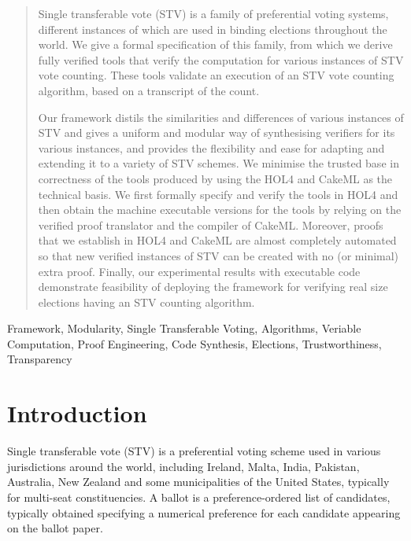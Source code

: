 \documentclass[10pt,conference]{IEEEtran}
\begin{document}
\maketitle
\begin{abstract}
Single transferable vote (STV) is a family of preferential voting systems, different instances of which are used in binding elections throughout the world. We give a formal specification of this family, from which we derive fully verified tools that verify the computation for various instances of STV vote counting. These tools validate 
 an execution of an STV vote counting algorithm, based on a transcript of the count.

Our framework distils the similarities and differences of various instances of STV and gives a uniform and modular way of synthesising verifiers for its various instances, and provides the flexibility and ease for adapting and extending it to a variety of STV schemes. We minimise the trusted base in correctness of the tools produced by using the HOL4 and CakeML as the technical basis. We first formally specify and verify the tools in HOL4 and then obtain the machine executable versions for the tools by relying on the verified proof translator and the compiler of CakeML. Moreover, proofs that we establish in HOL4 and CakeML are almost completely automated so that new verified instances of STV can be created with no (or minimal) extra proof. Finally, our experimental results with executable code demonstrate feasibility of deploying the framework for verifying real size elections having an STV counting algorithm.
\end{abstract}

\begin{IEEEkeywords}
Framework, Modularity, Single Transferable Voting, Algorithms, Veriable Computation, Proof Engineering, Code Synthesis, Elections, Trustworthiness, Transparency 
\end{IEEEkeywords}
\section{Introduction}\label{sec:intro}
Single transferable vote (STV)\cite{DFar} is a preferential voting scheme used in various jurisdictions around the world, including Ireland, Malta, India, Pakistan, Australia, New Zealand and some municipalities of the United States, typically for multi-seat constituencies.  A ballot is a preference-ordered list of candidates, typically obtained specifying a numerical preference for each candidate appearing on the ballot paper.
\end{document}
